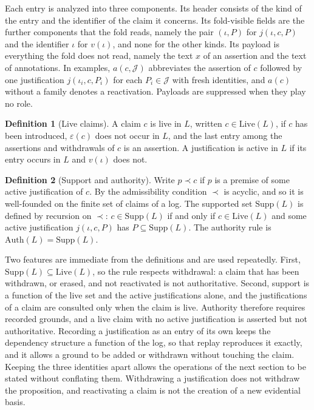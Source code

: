 \documentclass[11pt]{article}
\theoremstyle{plain}
\theoremstyle{definition}
\newtheorem{definition}{Definition}
\theoremstyle{remark}
\begin{document}
Each entry is analyzed into three components. Its header consists of the kind of the entry and the identifier of the claim it concerns. Its fold-visible fields are the further components that the fold reads, namely the pair $(\iota,P)$ for $j(\iota,c,P)$ and the identifier $\iota$ for $v(\iota)$, and none for the other kinds. Its payload is everything the fold does not read, namely the text $x$ of an assertion and the text of annotations. In examples, $a(c,\mathcal{J})$ abbreviates the assertion of $c$ followed by one justification $j(\iota_i,c,P_i)$ for each $P_i\in\mathcal{J}$ with fresh identities, and $a(c)$ without a family denotes a reactivation. Payloads are suppressed when they play no role.

\begin{definition}[Live claims]
A claim $c$ is live in $L$, written $c\in\mathrm{Live}(L)$, if $c$ has been introduced, $\varepsilon(c)$ does not occur in $L$, and the last entry among the assertions and withdrawals of $c$ is an assertion. A justification is active in $L$ if its entry occurs in $L$ and $v(\iota)$ does not.
\end{definition}

\begin{definition}[Support and authority]
Write $p\prec c$ if $p$ is a premise of some active justification of $c$. By the admissibility condition $\prec$ is acyclic, and so it is well-founded on the finite set of claims of a log. The supported set $\mathrm{Supp}(L)$ is defined by recursion on $\prec$: $c\in\mathrm{Supp}(L)$ if and only if $c\in\mathrm{Live}(L)$ and some active justification $j(\iota,c,P)$ has $P\subseteq\mathrm{Supp}(L)$. The authority rule is $\mathrm{Auth}(L)=\mathrm{Supp}(L)$.
\end{definition}

Two features are immediate from the definitions and are used repeatedly. First, $\mathrm{Supp}(L)\subseteq\mathrm{Live}(L)$, so the rule respects withdrawal: a claim that has been withdrawn, or erased, and not reactivated is not authoritative. Second, support is a function of the live set and the active justifications alone, and the justifications of a claim are consulted only when the claim is live. Authority therefore requires recorded grounds, and a live claim with no active justification is asserted but not authoritative. Recording a justification as an entry of its own keeps the dependency structure a function of the log, so that replay reproduces it exactly, and it allows a ground to be added or withdrawn without touching the claim. Keeping the three identities apart allows the operations of the next section to be stated without conflating them. Withdrawing a justification does not withdraw the proposition, and reactivating a claim is not the creation of a new evidential basis.
\end{document}
